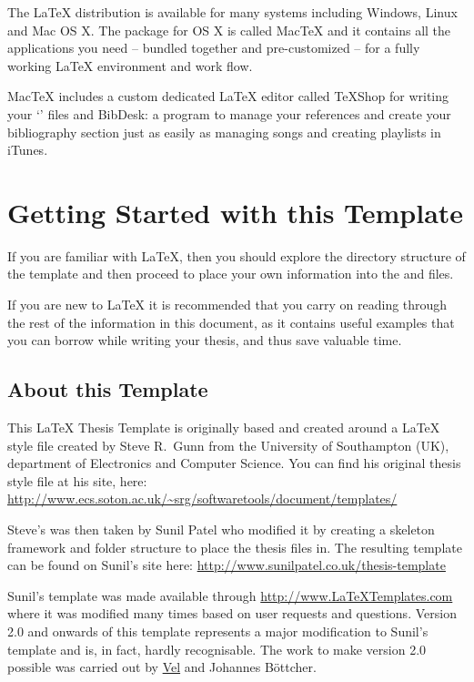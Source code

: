 The \LaTeX{} distribution is available for many systems including Windows, Linux and Mac OS X. The package for OS X is called MacTeX and it contains all the applications you need -- bundled together and pre-customized -- for a fully working \LaTeX{} environment and work flow.
 
MacTeX includes a custom dedicated \LaTeX{} editor called TeXShop for writing your `' files and BibDesk: a program to manage your references and create your bibliography section just as easily as managing songs and creating playlists in iTunes.

\section{Getting Started with this Template}

If you are familiar with \LaTeX{}, then you should explore the directory structure of the template and then proceed to place your own information into the  and  files. 

If you are new to \LaTeX{} it is recommended that you carry on reading through the rest of the information in this document, as it contains useful examples that you can borrow while writing your thesis, and thus save valuable time.

\subsection{About this Template}

This \LaTeX{} Thesis Template is originally based and created around a \LaTeX{} style file created by Steve R.\ Gunn from the University of Southampton (UK), department of Electronics and Computer Science. You can find his original thesis style file at his site, here:
\url{http://www.ecs.soton.ac.uk/~srg/softwaretools/document/templates/}

Steve's  was then taken by Sunil Patel who modified it by creating a skeleton framework and folder structure to place the thesis files in. The resulting template can be found on Sunil's site here:
\url{http://www.sunilpatel.co.uk/thesis-template}

Sunil's template was made available through \url{http://www.LaTeXTemplates.com} where it was modified many times based on user requests and questions. Version 2.0 and onwards of this template represents a major modification to Sunil's template and is, in fact, hardly recognisable. The work to make version 2.0 possible was carried out by \href{mailto:vel@latextemplates.com}{Vel} and Johannes Böttcher.

